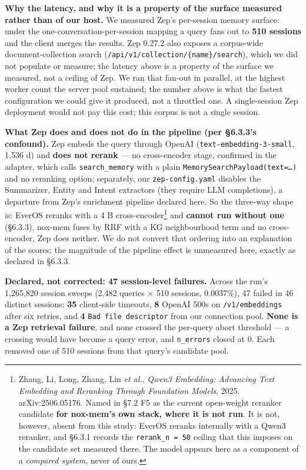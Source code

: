 \documentclass[
]{article}
\newcounter{none} %
\begin{document}
\textbf{Why the latency, and why it is a property of the surface
measured rather than of our host.} We measured Zep's per-session memory
surface: under the one-conversation-per-session mapping a query fans out
to \textbf{510 sessions} and the client merges the results. Zep 0.27.2
also exposes a corpus-wide document-collection search
(\texttt{/api/v1/collection/\{name\}/search}), which we did not populate
or measure; the latency above is a property of the surface we measured,
not a ceiling of Zep. We ran that fan-out in parallel, at the highest
worker count the server pool sustained; the number above is what the
fastest configuration we could give it produced, not a throttled one. A
single-session Zep deployment would not pay this cost; this corpus is
not a single session.

\textbf{What Zep does and does not do in the pipeline (per §6.3.3's
confound).} Zep embeds the query through OpenAI
(\texttt{text-embedding-3-small}, 1,536 d) and \textbf{does not rerank}
--- no cross-encoder stage, confirmed in the adapter, which calls
\texttt{search\_memory} with a plain
\texttt{MemorySearchPayload(text=…)} and no reranking option;
separately, our \texttt{zep-config.yaml} disables the Summarizer, Entity
and Intent extractors (they require LLM completions), a departure from
Zep's enrichment pipeline declared here. So the three-way shape is:
EverOS reranks with a 4 B cross-encoder\footnote{Zhang, Li, Long, Zhang,
  Lin \emph{et al.}, \emph{Qwen3 Embedding: Advancing Text Embedding and
  Reranking Through Foundation Models}, 2025. arXiv:2506.05176. Named in
  §7.2 F5 as the current open-weight reranker candidate \textbf{for
  nox-mem's own stack, where it is not run}. It is not, however, absent
  from this study: EverOS reranks internally with a Qwen3 reranker, and
  §6.3.1 records the \texttt{rerank\_n\ =\ 50} ceiling that this imposes
  on the candidate set measured there. The model appears here as a
  component of a \emph{compared system}, never of ours.} and
\textbf{cannot run without one} (§6.3.3), nox-mem fuses by RRF with a KG
neighbourhood term and no cross-encoder, Zep does neither. We do not
convert that ordering into an explanation of the scores; the magnitude
of the pipeline effect is unmeasured here, exactly as declared in
§6.3.3.

\textbf{Declared, not corrected: 47 session-level failures.} Across the
run's 1,265,820 session sweeps (2,482 queries × 510 sessions, 0.0037\%),
47 failed in 46 distinct sessions: \textbf{35} client-side timeouts,
\textbf{8} OpenAI 500s on \texttt{/v1/embeddings} after six retries, and
\textbf{4} \texttt{Bad\ file\ descriptor} from our connection pool.
\textbf{None is a Zep retrieval failure}, and none crossed the per-query
abort threshold --- a crossing would have become a query error, and
\texttt{n\_errors} closed at 0. Each removed one of 510 sessions from
that query's candidate pool.
\end{document}
